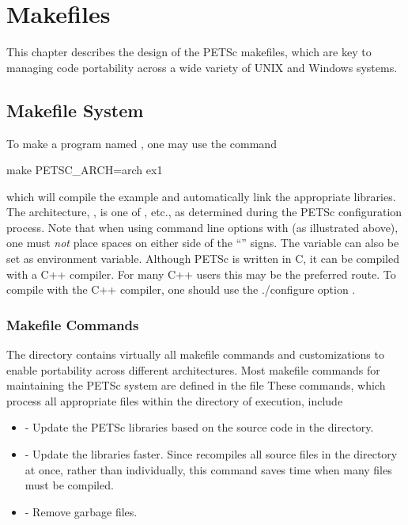 {{%
\cleardoublepage
\chapter{Makefiles}
\label{ch_makefiles}

This chapter describes the design of the PETSc makefiles, which are
key to managing code portability across a wide variety of UNIX and Windows systems.

\section{Makefile System}

To make a program named , one may use the command
\begin{bashlisting}
make PETSC_ARCH=arch ex1
\end{bashlisting}
which will compile the
example and automatically link the appropriate libraries.  The
architecture, , is one of , etc., as determined during the PETSc configuration process.
Note that when using command line options with  (as illustrated above),
one must {\em not} place spaces on either side of the ``\trl{=}'' signs.
The variable  can also be set as environment
variable.  Although PETSc is written in C, it can be compiled with a
C++ compiler.  For many C++ users this may be the preferred route. To compile
with the C++ compiler, one should use the ./configure option . 

\subsection{Makefile Commands} \label{sec_common}

The directory 
contains virtually all
makefile commands and customizations to enable portability across
different architectures.  Most makefile commands for maintaining the
PETSc system are defined in the file 
These commands, which process all appropriate files within the
directory of execution, include
\begin{itemize}
\item {} - Update the PETSc libraries based on the source code
      in the directory.
\item {} - Update the libraries faster.  Since
       recompiles all source files in the directory at once,
      rather than individually, this command saves time when many files
      must be compiled.
\item {} - Remove garbage files.
\end{itemize}

}}
